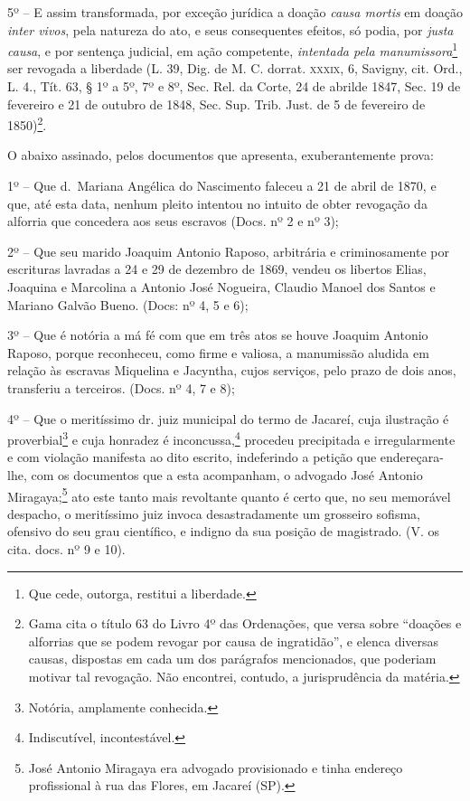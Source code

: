 {5º -- E assim transformada, por exceção jurídica a doação \emph{causa
mortis} em doação \emph{inter vivos}, pela natureza do ato, e seus
consequentes efeitos, só podia, por \emph{justa causa}, e por sentença
judicial, em ação competente, \emph{intentada pela
manumissora}\footnote{ Que cede, outorga, restitui a liberdade.} ser
revogada a liberdade (L. 39, Dig. de M. C. dorrat. \textsc{xxxix}, 6, Savigny,
cit. Ord., L. 4., Tít. 63, § 1º a 5º, 7º e 8º, Sec. Rel. da Corte, 24 de
abrilde 1847, Sec. 19 de fevereiro e 21 de outubro de 1848, Sec. Sup.
Trib. Just. de 5 de fevereiro de 1850)\footnote{ Gama cita o título 63
  do Livro 4º das Ordenações, que versa sobre ``doações e alforrias
  que se podem revogar por causa de ingratidão'', e elenca diversas
  causas, dispostas em cada um dos parágrafos mencionados, que poderiam
  motivar tal revogação. Não encontrei, contudo, a jurisprudência da
  matéria.}.

O abaixo assinado, pelos documentos que apresenta, exuberantemente
prova:

1º -- Que d.~Mariana Angélica do Nascimento faleceu a 21 de abril de
1870, e que, até esta data, nenhum pleito intentou no intuito de obter
revogação da alforria que concedera aos seus escravos (Docs. nº 2 e nº
3);

2º -- Que seu marido Joaquim Antonio Raposo, arbitrária e criminosamente
por escrituras lavradas a 24 e 29 de dezembro de 1869, vendeu os
libertos Elias, Joaquina e Marcolina a Antonio José Nogueira, Claudio
Manoel dos Santos e Mariano Galvão Bueno. (Docs: nº 4, 5 e 6);

3º -- Que é notória a má fé com que em três atos se houve Joaquim
Antonio Raposo, porque reconheceu, como firme e valiosa, a manumissão
aludida em relação às escravas Miquelina e Jacyntha, cujos serviços,
pelo prazo de dois anos, transferiu a terceiros. (Docs. nº 4, 7 e 8);

4º -- Que o meritíssimo dr. juiz municipal do termo de Jacareí, cuja
ilustração é proverbial\footnote{ Notória, amplamente conhecida.} e
cuja honradez é inconcussa,\footnote{ Indiscutível, incontestável.}
procedeu precipitada e irregularmente e com violação manifesta ao dito
escrito, indeferindo a petição que endereçara-lhe, com os documentos que
a esta acompanham, o advogado José Antonio Miragaya;\footnote{ José
  Antonio Miragaya era advogado provisionado e tinha endereço
  profissional à rua das Flores, em Jacareí (SP).} ato este tanto mais
revoltante quanto é certo que, no seu memorável despacho, o meritíssimo
juiz invoca desastradamente um grosseiro sofisma, ofensivo do seu grau
científico, e indigno da sua posição de magistrado. (V. os cita. docs.
nº 9 e 10).

}
